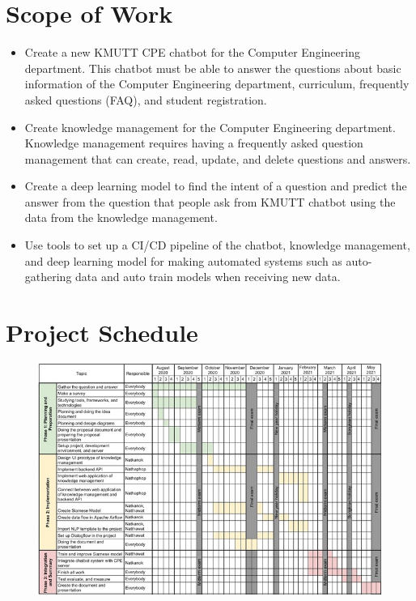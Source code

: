 \documentclass[12pt,oneside,openright,a4paper]{cpe-english-project}
\begin{document}
\section{Scope of Work}

\begin{itemize}
\item  Create a new KMUTT CPE chatbot for the Computer Engineering department. This chatbot must be able to answer
the questions about basic information of the Computer Engineering department, curriculum, frequently asked questions
(FAQ), and student registration.
\item  Create knowledge management for the Computer Engineering department. Knowledge management requires having
a frequently asked question management that can create, read, update, and delete questions and answers.
\item  Create a deep learning model to find the intent of a question and predict the answer from the question
that people ask from KMUTT chatbot using the data from the knowledge management.
\item  Use tools to set up a CI/CD pipeline of the chatbot, knowledge management, and deep learning model for
making automated systems such as auto-gathering data and auto train models when receiving new data.
\end{itemize}

\section{Project Schedule}
\begin{figure}[!h]\centering
\includegraphics[width=15cm]{img/ch1/ProjectSchedule.jpg}
\label{fig:ProjectSchedule.jpg}
\end{figure}
\end{document}
